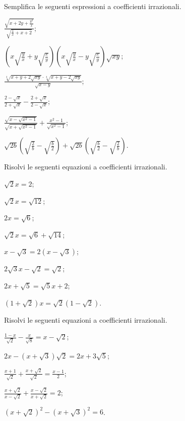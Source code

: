 \begin{esercizio}[\Ast]
 \label{ese:2.99}
Semplifica le seguenti espressioni a coefficienti irrazionali.
 \begin{enumeratea}
 \item $\frac{\sqrt{x+2y+\frac{y^{2}}{x}}}{\sqrt{\frac{1}{x}+x+2}}$;
 \item $\left(x\sqrt{\frac{y}{x}}+y\sqrt{\frac{x}{y}}\right)\left(x\sqrt{\frac{y}{x}}-y\sqrt{\frac{x}{y}}\right)\sqrt{xy}$;
 \item $\frac{\sqrt[4]{x+y+2\sqrt{xy}}\cdot\sqrt[4]{x+y-2\sqrt{xy}}}{\sqrt{x-y}}$;
 \item $\frac{2-\sqrt{x}}{2+\sqrt{x}}-\frac{2+\sqrt{x}}{2-\sqrt{x}}$;
 \item $\frac{\sqrt{x-\sqrt{x^{2}-1}}}{\sqrt{x+\sqrt{x^{2}-1}}}+\frac{x^{2}-1}{\sqrt{x^{2}-1}}$;
 \item $\sqrt{2b}\left(\sqrt{\frac{2}{b}}-\sqrt{\frac{b}{2}} \right)+\sqrt{2b}\left(\sqrt{\frac{b}{2}}-\sqrt{\frac{2}{b}} \right)$.
 \end{enumeratea}
\end{esercizio}

\begin{esercizio}[\Ast]
 \label{ese:2.100}
Risolvi le seguenti equazioni a coefficienti irrazionali.
 \begin{multicols}{2}
 \begin{enumeratea}
 \item $\sqrt 2x=2$;
 \item $\sqrt 2x=\sqrt{12}$;
 \item $2x=\sqrt 6$;
 \item $\sqrt 2x=\sqrt 6+\sqrt{14}$;
 \item $x-\sqrt 3=2\left(x-\sqrt 3\right)$;
 \item $2\sqrt 3x-\sqrt 2=\sqrt 2$;
 \item $2x+\sqrt 5=\sqrt 5x+2$;
 \item $(1+\sqrt 2)x=\sqrt 2(1-\sqrt 2)$.
 \end{enumeratea}
 \end{multicols}
\end{esercizio}

\begin{esercizio}[\Ast]
 \label{ese:2.101}
Risolvi le seguenti equazioni a coefficienti irrazionali.
 \begin{multicols}{2}
 \begin{enumeratea}
 \item $\frac{1-x}{\sqrt 2}-\frac x{\sqrt 8}=x-\sqrt 2$;
 \item $2x-\left(x+\sqrt 3\right)\sqrt 2=2x+3\sqrt 5$;
 \item $\frac{x+1}{\sqrt 2}+\frac{x+\sqrt 2}{\sqrt 2}=\frac{x-1} 2$;
 \item $\frac{x+\sqrt 2}{x-\sqrt 2}+\frac{x-\sqrt 2}{x+\sqrt 2}=2$;
 \item $(x+\sqrt 2)^2-(x+\sqrt 3)^2=6$.
 \end{enumeratea}
 \end{multicols}
\end{esercizio}

